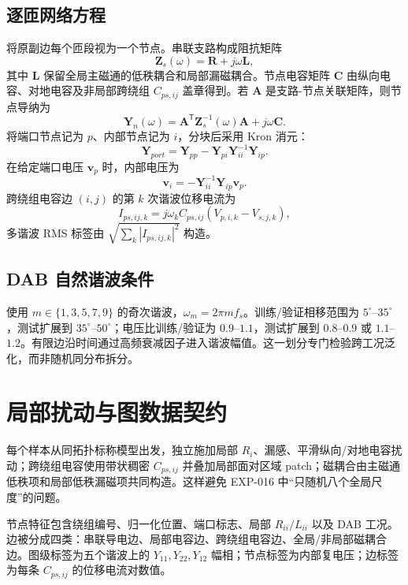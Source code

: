 \documentclass[11pt,a4paper]{ctexart}
\begin{document}
\subsection{逐匝网络方程}
将原副边每个匝段视为一个节点。串联支路构成阻抗矩阵
\begin{equation}
 \bm Z_s(\omega)=\bm R+j\omega\bm L,
\end{equation}
其中 $\bm L$ 保留全局主磁通的低秩耦合和局部漏磁耦合。节点电容矩阵 $\bm C$ 由纵向电容、对地电容及非局部跨绕组 $C_{ps,ij}$ 盖章得到。若 $\bm A$ 是支路-节点关联矩阵，则节点导纳为
\begin{equation}
 \bm Y_n(\omega)=\bm A^{\mathsf T}\bm Z_s^{-1}(\omega)\bm A+j\omega\bm C.
\end{equation}
将端口节点记为 $p$、内部节点记为 $i$，分块后采用 Kron 消元：
\begin{equation}
 \bm Y_{port}=\bm Y_{pp}-\bm Y_{pi}\bm Y_{ii}^{-1}\bm Y_{ip}.
\end{equation}
在给定端口电压 $\bm v_p$ 时，内部电压为
\begin{equation}
 \bm v_i=-\bm Y_{ii}^{-1}\bm Y_{ip}\bm v_p.
\end{equation}
跨绕组电容边 $(i,j)$ 的第 $k$ 次谐波位移电流为
\begin{equation}
 I_{ps,ij,k}=j\omega_k C_{ps,ij}\left(V_{p,i,k}-V_{s,j,k}\right),
\end{equation}
多谐波 RMS 标签由 $\sqrt{\sum_k |I_{ps,ij,k}|^2}$ 构造。

\subsection{DAB 自然谐波条件}
使用 $m\in\{1,3,5,7,9\}$ 的奇次谐波，$\omega_m=2\pi m f_s$。训练/验证相移范围为 $5^\circ$--$35^\circ$，测试扩展到 $35^\circ$--$50^\circ$；电压比训练/验证为 $0.9$--$1.1$，测试扩展到 $0.8$--$0.9$ 或 $1.1$--$1.2$。有限边沿时间通过高频衰减因子进入谐波幅值。这一划分专门检验跨工况泛化，而非随机同分布拆分。

\section{局部扰动与图数据契约}
每个样本从同拓扑标称模型出发，独立施加局部 $R_i$、漏感、平滑纵向/对地电容扰动；跨绕组电容使用带状稠密 $C_{ps,ij}$ 并叠加局部面对区域 patch；磁耦合由主磁通低秩项和局部低秩漏磁项共同构造。这样避免 EXP-016 中“只随机八个全局尺度”的问题。

节点特征包含绕组编号、归一化位置、端口标志、局部 $R_{ii}/L_{ii}$ 以及 DAB 工况。边被分成四类：串联导电边、局部电容边、跨绕组电容边、全局/非局部磁耦合边。图级标签为五个谐波上的 $Y_{11},Y_{22},Y_{12}$ 幅相；节点标签为内部复电压；边标签为每条 $C_{ps,ij}$ 的位移电流对数值。
\end{document}
